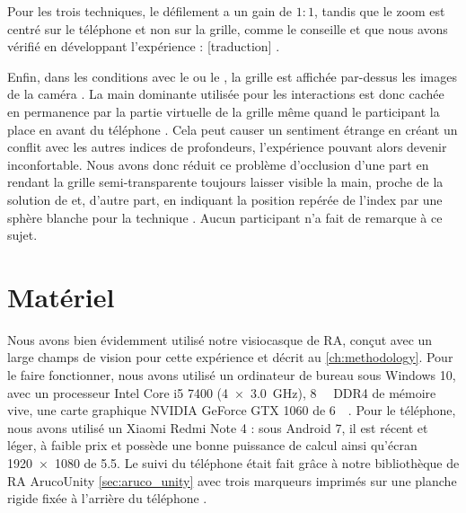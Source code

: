 Pour les trois techniques, le défilement a un gain de $1:1$, tandis que le zoom est centré sur le téléphone et non sur la grille, comme le conseille \cite{Guiard2004} et que nous avons vérifié en développant l'expérience : [traduction] .

Enfin, dans les conditions avec le  ou le , la grille est affichée par-dessus les images de la caméra . La main dominante utilisée pour les interactions est donc cachée en permanence par la partie virtuelle de la grille même quand le participant la place en avant du téléphone . Cela peut causer un sentiment étrange en créant un conflit avec les autres indices de profondeurs, l'expérience pouvant alors devenir inconfortable. Nous avons donc réduit ce problème d'occlusion d'une part en rendant la grille semi-transparente toujours laisser visible la main, proche de la solution de \cite{Piumsomboon2014} et, d'autre part, en indiquant la position repérée de l'index par une sphère blanche pour la technique . Aucun participant n'a fait de remarque à ce sujet.


\section{Matériel}
\label{sec:experiment_material}

Nous avons bien évidemment utilisé notre visiocasque de RA, conçut avec un large champs de vision pour cette expérience et décrit au \autoref{ch:methodology}. Pour le faire fonctionner, nous avons utilisé un ordinateur de bureau sous Windows 10, avec un processeur Intel Core i5 7400 (\SI[product-units = single]{4x3.0}{\GHz}), \SI{8}{\giga\byte} DDR4 de mémoire vive, une carte graphique NVIDIA GeForce GTX 1060 de \SI{6}{\giga\byte}. Pour le téléphone, nous avons utilisé un Xiaomi Redmi Note 4 : sous Android 7, il est récent et léger, à faible prix et possède une bonne puissance de calcul ainsi qu'écran \SI{1920x1080}{\px} de \SI{5.5}{\inch}. Le suivi du téléphone était fait grâce à notre bibliothèque de RA ArucoUnity \autoref{sec:aruco_unity} avec trois marqueurs imprimés sur une planche rigide fixée à l'arrière du téléphone .


